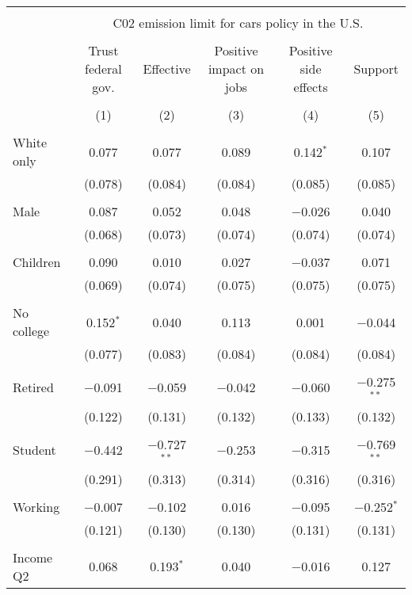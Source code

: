 
\begin{tabular}{@{\extracolsep{5pt}}lccccc} 
\\[-1.8ex]\hline 
\hline \\[-1.8ex] 
 & \multicolumn{5}{c}{C02 emission limit for cars policy in the U.S.} \\ 
\cline{2-6} 
\\[-1.8ex] & Trust federal gov. & Effective & Positive impact on jobs & Positive side effects & Support \\ 
\\[-1.8ex] & (1) & (2) & (3) & (4) & (5)\\ 
\hline \\[-1.8ex] 
 White only & 0.077 & 0.077 & 0.089 & 0.142$^{*}$ & 0.107 \\ 
  & (0.078) & (0.084) & (0.084) & (0.085) & (0.085) \\ 
  & & & & & \\ 
 Male & 0.087 & 0.052 & 0.048 & $-$0.026 & 0.040 \\ 
  & (0.068) & (0.073) & (0.074) & (0.074) & (0.074) \\ 
  & & & & & \\ 
 Children & 0.090 & 0.010 & 0.027 & $-$0.037 & 0.071 \\ 
  & (0.069) & (0.074) & (0.075) & (0.075) & (0.075) \\ 
  & & & & & \\ 
 No college & 0.152$^{*}$ & 0.040 & 0.113 & 0.001 & $-$0.044 \\ 
  & (0.077) & (0.083) & (0.084) & (0.084) & (0.084) \\ 
  & & & & & \\ 
 Retired & $-$0.091 & $-$0.059 & $-$0.042 & $-$0.060 & $-$0.275$^{**}$ \\ 
  & (0.122) & (0.131) & (0.132) & (0.133) & (0.132) \\ 
  & & & & & \\ 
 Student & $-$0.442 & $-$0.727$^{**}$ & $-$0.253 & $-$0.315 & $-$0.769$^{**}$ \\ 
  & (0.291) & (0.313) & (0.314) & (0.316) & (0.316) \\ 
  & & & & & \\ 
 Working & $-$0.007 & $-$0.102 & 0.016 & $-$0.095 & $-$0.252$^{*}$ \\ 
  & (0.121) & (0.130) & (0.130) & (0.131) & (0.131) \\ 
  & & & & & \\ 
 Income Q2 & 0.068 & 0.193$^{*}$ & 0.040 & $-$0.016 & 0.127 \\ 

\end{tabular}
